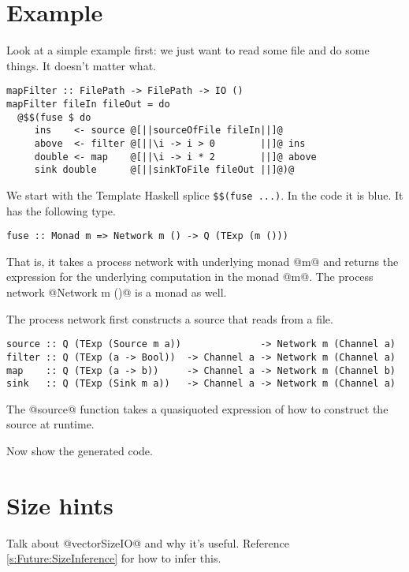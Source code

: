 \section{Example}

Look at a simple example first: we just want to read some file and do some things.
It doesn't matter what.
\begin{lstlisting}
mapFilter :: FilePath -> FilePath -> IO ()
mapFilter fileIn fileOut = do
  @$$(fuse $ do
     ins    <- source @[||sourceOfFile fileIn||]@
     above  <- filter @[||\i -> i > 0        ||]@ ins
     double <- map    @[||\i -> i * 2        ||]@ above
     sink double      @[||sinkToFile fileOut ||]@)@
\end{lstlisting}

We start with the Template Haskell splice \verb/$$(fuse ...)/. In the code it is blue. 
It has the following type.
\begin{lstlisting}
fuse :: Monad m => Network m () -> Q (TExp (m ()))
\end{lstlisting}
That is, it takes a process network with underlying monad @m@ and returns the expression for the underlying computation in the monad @m@.
The process network @Network m ()@ is a monad as well.

The process network first constructs a source that reads from a file.
\begin{lstlisting}
source :: Q (TExp (Source m a))              -> Network m (Channel a)
filter :: Q (TExp (a -> Bool))  -> Channel a -> Network m (Channel a)
map    :: Q (TExp (a -> b))     -> Channel a -> Network m (Channel b)
sink   :: Q (TExp (Sink m a))   -> Channel a -> Network m (Channel a)
\end{lstlisting}
The @source@ function takes a quasiquoted expression of how to construct the source at runtime.

Now show the generated code.

\section{Size hints}
\label{s:implementation:sizehints}
Talk about @vectorSizeIO@ and why it's useful.
Reference \autoref{s:Future:SizeInference} for how to infer this.

